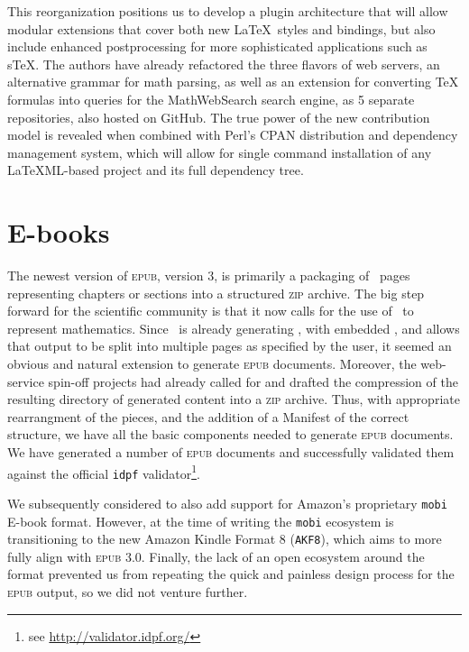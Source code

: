 \documentclass{llncs}
\def\ebook{\mbox{E-book}\xspace}
\def\ebooks{\mbox{E-books}\xspace}
\def\epub{\textsc{epub}\xspace}
\def\zip{\textsc{zip}\xspace}
\begin{document}
This reorganization positions us to develop a plugin architecture that will allow modular extensions
that cover both new \LaTeX\ styles and bindings, but also
include enhanced postprocessing for more sophisticated applications
such as s\TeX. The authors have already refactored the three flavors of {\LaTeXML} web servers, an alternative grammar for math parsing,
as well as an extension for converting {\TeX} formulas into queries for the MathWebSearch search engine, as 5 separate repositories, also hosted on GitHub.
The true power of the new contribution model is revealed when combined with Perl's CPAN distribution and dependency management system,
 which will allow for single command installation of any LaTeXML-based project and its full dependency tree.

\section{\ebooks}\label{ebooks}
The newest version of \epub, version 3, is primarily a packaging
of \HTML\ pages representing chapters or sections into a structured
\zip archive. The big step forward for the scientific community
is that it now calls for the use of \MathML\
to represent mathematics. Since \LaTeXML\ is already generating \HTML,
with embedded \MathML, and allows that output to be split into
multiple pages as specified by the user, it seemed an obvious
and natural extension to generate \epub documents. Moreover, the
web-service spin-off projects had already called for and drafted the compression of the resulting
directory of generated content into a \zip
archive.  Thus, with appropriate rearrangment of the pieces,
and the addition of a Manifest of the correct structure,
we have all the basic components needed to generate \epub documents. We have generated a number of \epub documents and successfully validated them against the official \texttt{idpf} validator\footnote{see \url{http://validator.idpf.org/}}.

We subsequently considered to also add support for Amazon's proprietary \texttt{mobi} \ebook format. However, at the time of writing the \texttt{mobi} ecosystem is transitioning to the new Amazon Kindle Format 8 (\texttt{AKF8}), which aims to more fully align with \epub 3.0. Finally, the lack of an open ecosystem around the format prevented us from repeating the quick and painless design process for the \epub output, so we did not venture further.
\end{document}
